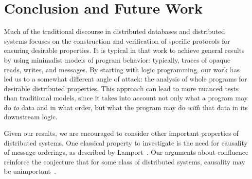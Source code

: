 \section{Conclusion and Future Work}
\label{sec:conclusion}
Much of the traditional discourse in distributed databases and distributed systems focuses on the construction and verification of specific protocols for ensuring desirable properties.  It is typical in that work to achieve general results by using minimalist models of program behavior: typically, traces of opaque reads, writes, and messages.  
By starting with logic programming, our work has led us to a somewhat different angle of attack: the analysis of whole programs for desirable distributed properties.
This approach can lead to more nuanced tests than traditional models, since it takes into account not only what a program may do \emph{to} data and in what order, but what the program may do \emph{with} that data in its downstream logic. 

Given our results, we are encouraged to consider other important properties of distributed systems.  One classical property to investigate is the need for causality of message orderings, as described by Lamport~\cite{timeclocks}.  Our arguments about confluence reinforce the conjecture that for some class of distributed systems, causality may be unimportant~\cite{declarative-imperative}.  

